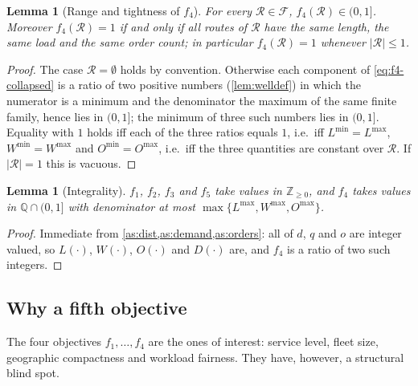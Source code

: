 \documentclass[11pt,a4paper]{article}
\theoremstyle{definition}
\theoremstyle{plain}
\newtheorem{lemma}[definition]{Lemma}
\newcommand{\Z}{\mathbb{Z}}
\newcommand{\Feas}{\mathcal{F}}
\newcommand{\Routes}{\mathcal{R}}
\newcommand{\Lmax}{L^{\max}}
\newcommand{\Wmax}{W^{\max}}
\newcommand{\Omax}{O^{\max}}
\begin{document}
\begin{lemma}[Range and tightness of $f_4$]
\label{lem:f4-range}
For every $\Routes \in \Feas$, $f_4(\Routes) \in (0,1]$.  Moreover
$f_4(\Routes) = 1$ if and only if all routes of $\Routes$ have the same length,
the same load and the same order count; in particular $f_4(\Routes) = 1$
whenever $|\Routes| \le 1$.
\end{lemma}

\begin{proof}
The case $\Routes = \emptyset$ holds by convention.  Otherwise each component
of \eqref{eq:f4-collapsed} is a ratio of two positive numbers
(\cref{lem:welldef}) in which the numerator is a minimum and the denominator
the maximum of the same finite family, hence lies in $(0,1]$; the minimum of
three such numbers lies in $(0,1]$.  Equality with $1$ holds iff each of the
three ratios equals $1$, i.e.\ iff $L^{\min} = \Lmax$, $W^{\min} = \Wmax$ and
$O^{\min} = \Omax$, i.e.\ iff the three quantities are constant over
$\Routes$.  If $|\Routes| = 1$ this is vacuous.
\end{proof}

\begin{lemma}[Integrality]
\label{lem:integrality}
$f_1$, $f_2$, $f_3$ and $f_5$ take values in $\Z_{\ge 0}$, and $f_4$ takes
values in $\mathbb{Q} \cap (0,1]$ with denominator at most
$\max\{\Lmax, \Wmax, \Omax\}$.
\end{lemma}

\begin{proof}
Immediate from \cref{as:dist,as:demand,as:orders}: all of $d$, $q$ and $o$ are
integer valued, so $L(\cdot)$, $W(\cdot)$, $O(\cdot)$ and $D(\cdot)$ are, and
$f_4$ is a ratio of two such integers.
\end{proof}

\subsection{Why a fifth objective}

The four objectives $f_1,\dots,f_4$ are the ones of interest: service level,
fleet size, geographic compactness and workload fairness.  They have, however,
a structural blind spot.
\end{document}
